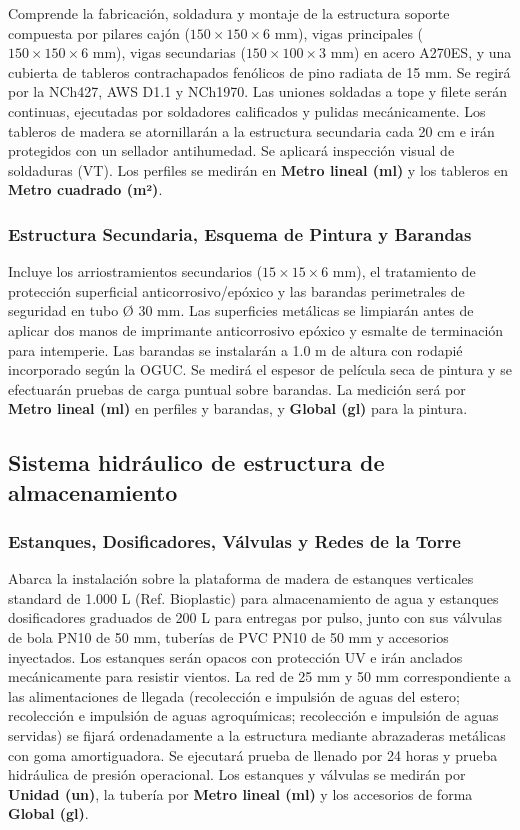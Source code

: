 Comprende la fabricación, soldadura y montaje de la estructura soporte compuesta por pilares cajón (\(150 \times 150 \times 6\text{~mm}\)), vigas principales (\(150 \times 150 \times 6\text{~mm}\)), vigas secundarias (\(150 \times 100 \times 3\text{~mm}\)) en acero A270ES, y una cubierta de tableros contrachapados fenólicos de pino radiata de 15 mm. Se regirá por la NCh427, AWS D1.1 y NCh1970. Las uniones soldadas a tope y filete serán continuas, ejecutadas por soldadores calificados y pulidas mecánicamente. Los tableros de madera se atornillarán a la estructura secundaria cada 20 cm e irán protegidos con un sellador antihumedad. Se aplicará inspección visual de soldaduras (VT). Los perfiles se medirán en \textbf{Metro lineal (ml)} y los tableros en \textbf{Metro cuadrado (m²)}.

\subsubsection*{Estructura Secundaria, Esquema de Pintura y Barandas}

Incluye los arriostramientos secundarios (\(15 \times 15 \times 6\text{~mm}\)), el tratamiento de protección superficial anticorrosivo/epóxico y las barandas perimetrales de seguridad en tubo Ø 30 mm. Las superficies metálicas se limpiarán antes de aplicar dos manos de imprimante anticorrosivo epóxico y esmalte de terminación para intemperie. Las barandas se instalarán a 1.0 m de altura con rodapié incorporado según la OGUC. Se medirá el espesor de película seca de pintura y se efectuarán pruebas de carga puntual sobre barandas. La medición será por \textbf{Metro lineal (ml)} en perfiles y barandas, y \textbf{Global (gl)} para la pintura.

\subsection{Sistema hidráulico de estructura de almacenamiento}

\subsubsection*{Estanques, Dosificadores, Válvulas y Redes de la Torre}

Abarca la instalación sobre la plataforma de madera de estanques verticales standard de 1.000 L (Ref. Bioplastic) para almacenamiento de agua y estanques dosificadores graduados de 200 L para entregas por pulso, junto con sus válvulas de bola PN10 de 50 mm, tuberías de PVC PN10 de 50 mm y accesorios inyectados. Los estanques serán opacos con protección UV e irán anclados mecánicamente para resistir vientos. La red de 25 mm y 50 mm correspondiente a las alimentaciones de llegada (recolección e impulsión de aguas del estero; recolección e impulsión de aguas agroquímicas; recolección e impulsión de aguas servidas) se fijará ordenadamente a la estructura mediante abrazaderas metálicas con goma amortiguadora. Se ejecutará prueba de llenado por 24 horas y prueba hidráulica de presión operacional. Los estanques y válvulas se medirán por \textbf{Unidad (un)}, la tubería por \textbf{Metro lineal (ml)} y los accesorios de forma \textbf{Global (gl)}.

